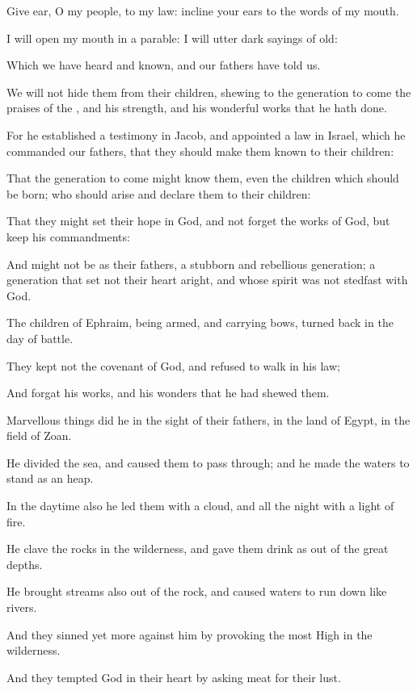 \Chapter
\Verse Give ear, O my people, to my law: incline your ears to the words of my mouth.

\Verse I will open my mouth in a parable: I will utter dark sayings of old:

\Verse Which we have heard and known, and our fathers have told us.

\Verse We will not hide them from their children, shewing to the generation to come the praises of the \LORD, and his strength, and his wonderful works that he hath done.

\Verse For he established a testimony in Jacob, and appointed a law in Israel, which he commanded our fathers, that they should make them known to their children:

\Verse That the generation to come might know them, even the children which should be born; who should arise and declare them to their children:

\Verse That they might set their hope in God, and not forget the works of God, but keep his commandments:

\Verse And might not be as their fathers, a stubborn and rebellious generation; a generation that set not their heart aright, and whose spirit was not stedfast with God.

\Verse The children of Ephraim, being armed, and carrying bows, turned back in the day of battle.

\Verse They kept not the covenant of God, and refused to walk in his law;

\Verse And forgat his works, and his wonders that he had shewed them.

\Verse Marvellous things did he in the sight of their fathers, in the land of Egypt, in the field of Zoan.

\Verse He divided the sea, and caused them to pass through; and he made the waters to stand as an heap.

\Verse In the daytime also he led them with a cloud, and all the night with a light of fire.

\Verse He clave the rocks in the wilderness, and gave them drink as out of the great depths.

\Verse He brought streams also out of the rock, and caused waters to run down like rivers.

\Verse And they sinned yet more against him by provoking the most High in the wilderness.

\Verse And they tempted God in their heart by asking meat for their lust.

